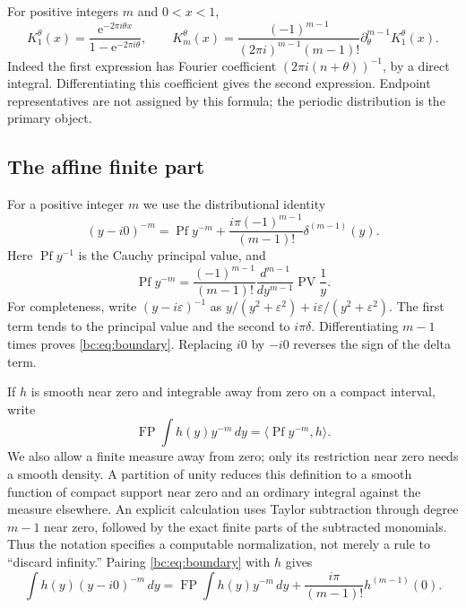\documentclass[11pt,letterpaper]{article}
\numberwithin{equation}{section}
\theoremstyle{definition}
\theoremstyle{remark}
\newcommand{\bcFP}{\operatorname{FP}}
\newcommand{\bcPf}{\operatorname{Pf}}
\newcommand{\bcPV}{\operatorname{PV}}
\newcommand{\bce}{\mathrm e}
\begin{document}
For positive integers $m$ and $0<x<1$,
\begin{equation}\label{bc:eq:integer-kernel}
 K_1^\theta(x)=\frac{\bce^{-2\pi i\theta x}}{1-\bce^{-2\pi i\theta}},
 \qquad
 K_m^\theta(x)=
 \frac{(-1)^{m-1}}{(2\pi i)^{m-1}(m-1)!}
          \partial_\theta^{m-1}K_1^\theta(x).
\end{equation}
Indeed the first expression has Fourier coefficient
$(2\pi i(n+\theta))^{-1}$, by a direct integral. Differentiating this
coefficient gives the second expression. Endpoint representatives are
not assigned by this formula; the periodic distribution is the primary
object.

\subsection{The affine finite part}

For a positive integer $m$ we use the distributional identity
\begin{equation}\label{bc:eq:boundary}
 (y-i0)^{-m}
 =\bcPf y^{-m}
  +\frac{i\pi(-1)^{m-1}}{(m-1)!}\delta^{(m-1)}(y).
\end{equation}
Here $\bcPf y^{-1}$ is the Cauchy principal value, and
\[
 \bcPf y^{-m}=\frac{(-1)^{m-1}}{(m-1)!}
                     \frac{d^{m-1}}{dy^{m-1}}\bcPV\frac1y.
\]
For completeness, write $(y-i\varepsilon)^{-1}$ as
$y/(y^2+\varepsilon^2)+i\varepsilon/(y^2+\varepsilon^2)$.
The first term tends to the principal value and the second to $i\pi\delta$.
Differentiating $m-1$ times proves \eqref{bc:eq:boundary}. Replacing $i0$
by $-i0$ reverses the sign of the delta term.

If $h$ is smooth near zero and integrable away from zero on a compact
interval, write
\[
 \bcFP\int h(y)y^{-m}\,dy=\langle\bcPf y^{-m},h\rangle.
\]
We also allow a finite measure away from zero; only its restriction near
zero needs a smooth density. A partition of unity reduces this definition
to a smooth function of compact support near zero and an ordinary integral
against the measure elsewhere. An explicit
calculation uses Taylor subtraction through degree $m-1$ near zero,
followed by the exact finite parts of the subtracted monomials. Thus the
notation specifies a computable normalization, not merely a rule to
``discard infinity.'' Pairing \eqref{bc:eq:boundary} with $h$ gives
\begin{equation}\label{bc:eq:boundary-pair}
 \int h(y)(y-i0)^{-m}\,dy
 =\bcFP\int h(y)y^{-m}\,dy
       +\frac{i\pi}{(m-1)!}h^{(m-1)}(0).
\end{equation}
\end{document}
